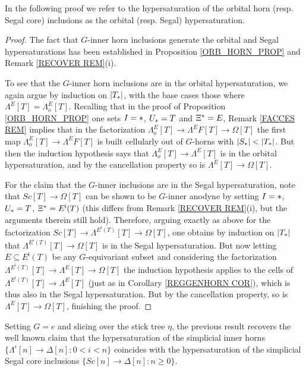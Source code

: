 \documentclass[a4paper,10pt,draft]{article}%
\begin{document}
In the following proof we refer to the hypersaturation
of the orbital horn (resp. Segal core) inclusions as the orbital (resp. Segal) hypersaturation.


\begin{proof}
	The fact that $G$-inner horn inclusions generate the orbital and Segal hypersaturations has been established in Proposition \ref{ORB_HORN_PROP} and Remark \ref{RECOVER REM}(i).
	
	To see that the $G$-inner horn inclusions are in the orbital hypersaturation, we again argue by induction on $|T_{\**}|$, with the base cases those where $\Lambda^{E} [T]=\Lambda^{E}_o [T]$.
	Recalling that in the proof of Proposition \ref{ORB_HORN_PROP}
	one sets
	$I=\**$, $U_{\**} = T$ and $\Xi^{\**} = E$,
	Remark \ref{FACCES REM} implies that in the factorization
	$\Lambda_o^E[T] \to \Lambda^EF[T] \to \Omega[T]$
	the first map $\Lambda_o^E[T] \to \Lambda^EF[T]$ is built cellularly out of $G$-horns with $|S_{\**}| < |T_{\**}|$.
	But then the induction hypothesis says that 
	$\Lambda_o^E[T] \to \Lambda^E[T]$ is in the orbital hypersaturation, and by the cancellation property so is $\Lambda^E[T] \to \Omega[T]$.
	
	For the claim that the $G$-inner inclusions are in the Segal hypersaturation,
	note that $Sc[T] \to \Omega[T]$ can be shown to be $G$-inner anodyne by setting $I=\**$, $U_{\**} = T$, $\Xi^{\**} = E^{\mathsf{i}}(T)$
	(this differs from Remark \ref{RECOVER REM}(i), but the arguments therein still hold).
	Therefore, arguing exactly as above for the factorization
	$Sc[T] \to \Lambda^{E^{\mathsf{i}}(T)}[T] \to \Omega[T]$,
	one obtains by induction on $|T_{\**}|$ that
	$\Lambda^{E^{\mathsf{i}}(T)}[T] \to \Omega[T]$
	is in the Segal hypersaturation. 
	But now letting $E \subseteq E^{\mathsf{i}}(T)$ be any $G$-equivariant subset and considering the factorization
	$\Lambda^{E^{\mathsf{i}}(T)}[T] \to 
	\Lambda^{E}[T] \to
	\Omega[T]$ the induction hypothesis applies to the cells of
	$\Lambda^{E^{\mathsf{i}}(T)}[T] \to \Lambda^{E}[T]$
	(just as in Corollary \ref{REGGENHORN COR}),
	which is thus also in the Segal hypersaturation.
	But by the cancellation property, so is 
	$\Lambda^{E}[T] \to \Omega[T]$, finishing the proof.
\end{proof}


\begin{remark}\label{SLICE REM}
	Setting $G=e$ and slicing over the stick tree $\eta$, the previous result
	recovers the well known claim that 
	the hypersaturation of the simplicial inner horns
	$\{\Lambda^i[n] \to \Delta[n] \colon 0< i < n\}$
	coincides with the hypersaturation of the simplicial Segal core inclusions
	$\{Sc[n] \to \Delta[n]\colon n \geq 0\}$.
\end{remark}
\end{document}
